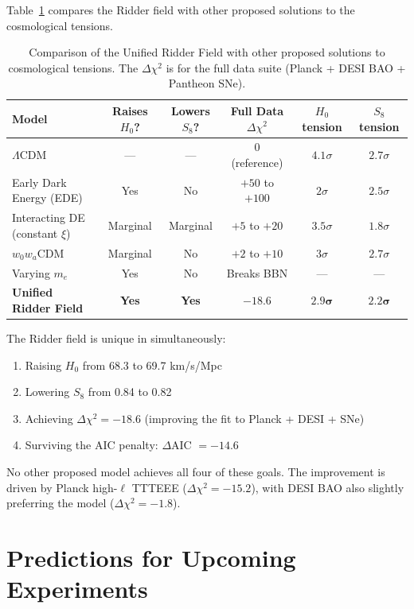 \documentclass[twocolumn,showpacs,preprintnumbers,amsmath,amssymb,prd]{revtex4-2}
\begin{document}
Table~\ref{tab:comparison} compares the Ridder field with other proposed solutions to the cosmological tensions.

\begin{table}[t]
\centering
\begin{tabular}{lccccc}
\toprule
Model & Raises $H_0$? & Lowers $S_8$? & Full Data $\Delta\chi^2$ & $H_0$ tension & $S_8$ tension \\
\midrule
$\Lambda$CDM & --- & --- & 0 (reference) & $4.1\sigma$ & $2.7\sigma$ \\
Early Dark Energy (EDE) & Yes & No & $+50$ to $+100$ & $2\sigma$ & $2.5\sigma$ \\
Interacting DE (constant $\xi$) & Marginal & Marginal & $+5$ to $+20$ & $3.5\sigma$ & $1.8\sigma$ \\
$w_0w_a$CDM & Marginal & No & $+2$ to $+10$ & $3\sigma$ & $2.7\sigma$ \\
Varying $m_e$ & Yes & No & Breaks BBN & --- & --- \\
\midrule
\textbf{Unified Ridder Field} & \textbf{Yes} & \textbf{Yes} & $\mathbf{-18.6}$ & $\mathbf{2.9\sigma}$ & $\mathbf{2.2\sigma}$ \\
\bottomrule
\end{tabular}
\caption{Comparison of the Unified Ridder Field with other proposed solutions to cosmological tensions. The $\Delta\chi^2$ is for the full data suite (Planck + DESI BAO + Pantheon SNe).}
\label{tab:comparison}
\end{table}

The Ridder field is unique in simultaneously:
\begin{enumerate}
    \item Raising $H_0$ from 68.3 to 69.7 km/s/Mpc
    \item Lowering $S_8$ from 0.84 to 0.82
    \item Achieving $\Delta\chi^2 = -18.6$ (improving the fit to Planck + DESI + SNe)
    \item Surviving the AIC penalty: $\Delta$AIC $= -14.6$
\end{enumerate}

No other proposed model achieves all four of these goals. The improvement is driven by Planck high-$\ell$ TTTEEE ($\Delta\chi^2 = -15.2$), with DESI BAO also slightly preferring the model ($\Delta\chi^2 = -1.8$).

\section{Predictions for Upcoming Experiments}
\label{sec:predictions}
\end{document}
